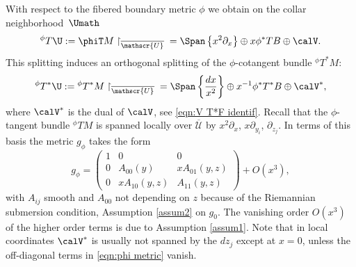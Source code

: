 With respect to the fibered boundary metric $\phi$ we obtain on the collar neighborhood~$\Umath$
\begin{equation}\label{splitting1}
{}^\phi T\U := \phiT M\restriction_{\overline{\mathscr{U}}}{} =
\Span \left\{x^2\partial_x\right\} \oplus x \phi^{*}T B \oplus \calV.
\end{equation}
This splitting induces an orthogonal splitting of the
$\phi$-cotangent bundle ${}^\phi T^*M$:
\begin{equation}\label{splitting2}
{}^\phi T^*\U :=
{}^\phi T^*M \restriction_{\overline{\mathscr{U}}}{} = \Span \left\{ \frac{dx}{x^2}\right\} \oplus x^{-1} \phi^*T^*B \oplus \calV^*,
\end{equation}
where $\calV^*$ is the dual of $\calV$, see \eqref{eqn:V T*F identif}.
Recall that the $\phi$-tangent bundle ${}^\phi TM$ is spanned locally over $\overline{\mathscr{U}}$
by $x^2\partial_x$, $x\partial_{y_i}$, $\partial_{z_j}$. In terms of this basis the metric $g_\phi$ takes the form
\begin{equation}
\label{eqn:phi metric}
g_\phi =
\begin{pmatrix}
1 & 0 & 0 \\
0 & A_{00}(y) & x A_{01}(y,z) \\
0 & x A_{10}(y,z) & A_{11}(y,z)
\end{pmatrix}
+ O(x^3),
\end{equation}
with $A_{ij}$ smooth and $A_{00}$ not depending on $z$ because of the Riemannian submersion condition, Assumption \ref{assum2} on $g_0$.
The vanishing order $O(x^3)$ of the higher order terms is due to Assumption \ref{assum1}.
Note that in local coordinates $\calV^*$ is usually not spanned by the $dz_j$ except at $x=0$, unless the off-diagonal terms in \eqref{eqn:phi metric} vanish.

